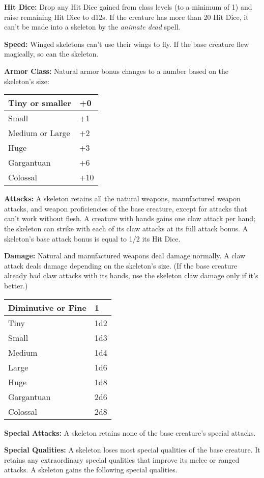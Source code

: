 \documentclass{article}
\begin{document}
\textbf{Hit Dice: }Drop any Hit Dice gained from class levels (to a minimum of 
1) and raise remaining Hit Dice to d12s. If the creature has more than 20 Hit Dice, 
it can't be made into a skeleton by the \textit{animate dead }spell.

\textbf{Speed: }Winged skeletons can't use their wings to fly. If the base creature 
flew magically, so can the skeleton.

\textbf{Armor Class:} Natural armor bonus changes to a number based on the skeleton's 
size:

\begin{tabular}{|>{\raggedright}p{69pt}|>{\raggedright}p{14pt}|}
\hline
Tiny or smaller & +0\tabularnewline
\hline
Small & +1\tabularnewline
\hline
Medium or Large & +2\tabularnewline
\hline
Huge & +3\tabularnewline
\hline
Gargantuan & +6\tabularnewline
\hline
Colossal & +10\tabularnewline
\hline
\end{tabular}

\textbf{Attacks:} A skeleton retains all the natural weapons, manufactured weapon 
attacks, and weapon proficiencies of the base creature, except for attacks that 
can't work without flesh. A creature with hands gains one claw attack per hand; 
the skeleton can strike with each of its claw attacks at its full attack bonus. 
A skeleton's base attack bonus is equal to 1/2 its Hit Dice.

\textbf{Damage:} Natural and manufactured weapons deal damage normally. A claw 
attack deals damage depending on the skeleton's size. (If the base creature already 
had claw attacks with its hands, use the skeleton claw damage only if it's better.)

\begin{tabular}{|>{\raggedright}p{75pt}|>{\raggedright}p{13pt}|}
\hline
Diminutive or Fine & 1\tabularnewline
\hline
Tiny & 1d2\tabularnewline
\hline
Small & 1d3\tabularnewline
\hline
Medium & 1d4\tabularnewline
\hline
Large & 1d6\tabularnewline
\hline
Huge & 1d8\tabularnewline
\hline
Gargantuan & 2d6\tabularnewline
\hline
Colossal & 2d8\tabularnewline
\hline
\end{tabular}

\textbf{Special Attacks: }A skeleton retains none of the base creature's special 
attacks.

\textbf{Special Qualities:} A skeleton loses most special qualities of the base 
creature. It retains any extraordinary special qualities that improve its melee 
or ranged attacks. A skeleton gains the following special qualities.
\end{document}
